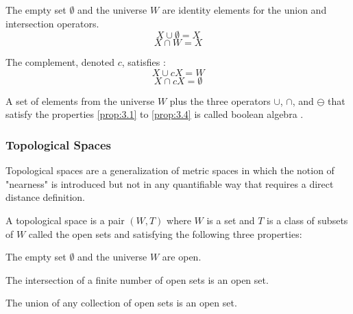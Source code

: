 \documentclass[a4paper,11pt,oneside]{article}
\begin{document}
\begin{property}
	\label{prop:3.3}
	The empty set $\emptyset$ and the universe $W$ are identity elements for the union and intersection operators. \cite{mansfield_1987}
	\begin{equation*}
		X \cup \emptyset = X
	\end{equation*}
	\begin{equation*}
		X \cap W = X
	\end{equation*}
\end{property}
        
\begin{property}
	\label{prop:3.4}
	The complement, denoted $c$, satisfies \cite{mansfield_1987}:
	\begin{equation*}	
		X \cup cX = W
	\end{equation*}
	\begin{equation*}
		X \cap cX = \emptyset
	\end{equation*}
	\cite{mansfield_1987}
\end{property}


    
\begin{definition}
	A set of elements from the universe $W$ plus the three operators $\cup$, $\cap$, and $\ominus$ that satisfy the properties \eqref{prop:3.1} to \eqref{prop:3.4} is called boolean algebra \cite{Requicha1978MathematicalFO}.
\end{definition}
    
\subsubsection{Topological Spaces}
    
Topological spaces are a generalization of metric spaces in which the notion of "nearness" is introduced but not in any quantifiable way that requires a direct distance definition.
    
\begin{definition}
	A topological space is a pair $(W, T)$ where $W$ is a set and $T$ is a class of subsets of $W$ called the open sets and satisfying the following three properties:
	\begin{property}
		\label{ts:3.5}
		The empty set $\emptyset$ and the universe $W$ are open.\cite{mansfield_1987}
	\end{property}
	\begin{property}
		\label{ts:3.6}
		The intersection of a finite number of open sets is an open set. \cite{mansfield_1987}
	\end{property}
	\begin{property}
		\label{ts:3.7}
		The union of any collection of open sets is an open set. \cite{mansfield_1987}
	\end{property}
\end{definition}
    
\end{document}
